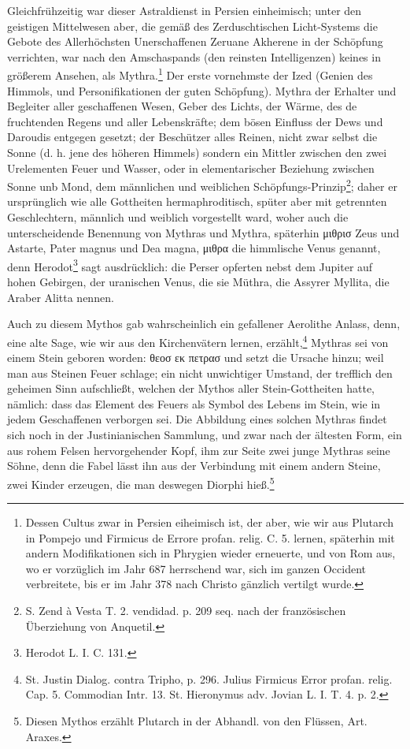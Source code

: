 \documentclass[a4paper, 11pt, oneside, polutonikogreek, german]{article}
\begin{document}
Gleichfrühzeitig war dieser Astraldienst in Persien einheimisch; unter den geistigen Mittelwesen aber, die gemäß des Zerduschtischen Licht-Systems die Gebote des Allerhöchsten Unerschaffenen Zeruane Akherene in der Schöpfung verrichten, war nach den Amschaspands (den reinsten Intelligenzen) keines in größerem Ansehen, als Mythra.\footnote{Dessen Cultus zwar in Persien eiheimisch ist, der aber, wie wir aus Plutarch in Pompejo und Firmicus de Errore profan. relig. C. 5. lernen, späterhin mit andern Modifikationen sich in Phrygien wieder erneuerte, und von Rom aus, wo er vorzüglich im Jahr 687 herrschend war, sich im ganzen Occident verbreitete, bis er im Jahr 378 nach Christo gänzlich vertilgt wurde.} Der erste vornehmste der Ized (Genien des Himmols, und Personifikationen der guten Schöpfung). Mythra der Erhalter und Begleiter aller geschaffenen Wesen, Geber des Lichts, der Wärme, des de fruchtenden Regens und aller Lebenskräfte; dem bösen Einfluss der Dews und Daroudis entgegen gesetzt; der Beschützer alles Reinen, nicht zwar selbst die Sonne (d. h. jene des höheren Himmels) sondern ein Mittler zwischen den zwei Urelementen Feuer und Wasser, oder in elementarischer Beziehung zwischen Sonne unb Mond, dem männlichen und weiblichen Schöpfungs-Prinzip\footnote{S. Zend à Vesta T. 2. vendidad. p. 209 seq. nach der französischen Überziehung von Anquetil.}; daher er ursprünglich wie alle Gottheiten hermaphroditisch, spüter aber mit getrennten Geschlechtern, männlich und weiblich vorgestellt ward, woher auch die unterscheidende Benennung von Mythras und Mythra, späterhin μιθρισ Zeus und Astarte, Pater magnus und Dea magna, μιθρα die himmlische Venus genannt, denn Herodot\footnote{Herodot L. I. C. 131.} sagt ausdrücklich: die Perser opferten nebst dem Jupiter auf hohen Gebirgen, der uranischen Venus, die sie Müthra, die Assyrer Myllita, die Araber Alitta nennen.

Auch zu diesem Mythos gab wahrscheinlich ein gefallener Aerolithe Anlass, denn, eine alte Sage, wie wir aus den Kirchenvätern lernen, erzählt,\footnote{St. Justin Dialog. contra Tripho, p. 296. Julius Firmicus Error profan. relig. Cap. 5. Commodian Intr. 13. St. Hieronymus adv. Jovian L. I. T. 4. p. 2.} Mythras sei von einem Stein geboren worden: θεοσ εκ πετρασ und setzt die Ursache hinzu; weil man aus Steinen Feuer schlage; ein nicht unwichtiger Umstand, der trefflich den geheimen Sinn aufschließt, welchen der Mythos aller Stein-Gottheiten hatte, nämlich: dass das Element des Feuers als Symbol des Lebens im Stein, wie in jedem Geschaffenen verborgen sei. Die Abbildung eines solchen Mythras findet sich noch in der Justinianischen Sammlung, und zwar nach der ältesten Form, ein aus rohem Felsen hervorgehender Kopf, ihm zur Seite zwei junge Mythras seine Söhne, denn die Fabel lässt ihn aus der Verbindung mit einem andern Steine, zwei Kinder erzeugen, die man deswegen Diorphi hieß.\footnote{Diesen Mythos erzählt Plutarch in der Abhandl. von den Flüssen, Art. Araxes.}
\end{document}
